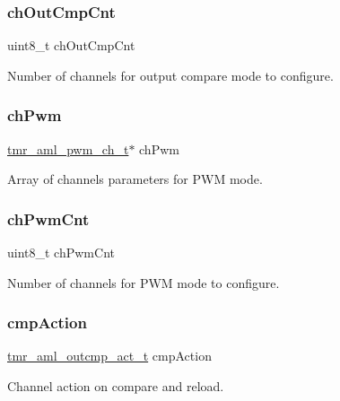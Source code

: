 \subsubsection{\texorpdfstring{chOutCmpCnt}{chOutCmpCnt}}
{\footnotesize\ttfamily uint8\+\_\+t ch\+Out\+Cmp\+Cnt}

Number of channels for output compare mode to configure. \mbox{\label{group__globals__group_ga4adfc517ee2b4d31e619344efd325f0e}} 
\subsubsection{\texorpdfstring{chPwm}{chPwm}}
{\footnotesize\ttfamily \mbox{\hyperlink{structtmr__aml__pwm__ch__t}{tmr\+\_\+aml\+\_\+pwm\+\_\+ch\+\_\+t}}$\ast$ ch\+Pwm}

Array of channels parameters for P\+WM mode. \mbox{\label{group__globals__group_ga3958cb513ef18a35e622c66e94fc99ea}} 
\subsubsection{\texorpdfstring{chPwmCnt}{chPwmCnt}}
{\footnotesize\ttfamily uint8\+\_\+t ch\+Pwm\+Cnt}

Number of channels for P\+WM mode to configure. \mbox{\label{group__globals__group_gaba939de9e86521e98f097d6a761f5b59}} 
\subsubsection{\texorpdfstring{cmpAction}{cmpAction}}
{\footnotesize\ttfamily \mbox{\hyperlink{group__enum__group_ga50dbf45b245f7b30d865189716b25db5}{tmr\+\_\+aml\+\_\+outcmp\+\_\+act\+\_\+t}} cmp\+Action}

Channel action on compare and reload. \mbox{\label{group__globals__group_gad34053d0dd1f608826c1afdf92427692}} 
